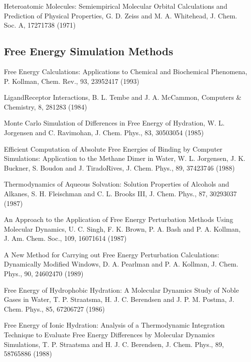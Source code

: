 \documentclass[letterpaper,11pt,english]{sphinxmanual}
\begin{document}
\sphinxAtStartPar
Hetero\sphinxhyphen{}atomic Molecules: Semi\sphinxhyphen{}empirical Molecular Orbital Calculations and Prediction of Physical Properties, G. D. Zeiss and M. A. Whitehead, J. Chem. Soc. A, 1727\sphinxhyphen{}1738 (1971)


\subsection{Free Energy Simulation Methods}
\label{\detokenize{text/references:free-energy-simulation-methods}}
\sphinxAtStartPar
Free Energy Calculations: Applications to Chemical and Biochemical Phenomena, P. Kollman, Chem. Rev., 93, 2395\sphinxhyphen{}2417 (1993)

\sphinxAtStartPar
Ligand\sphinxhyphen{}Receptor Interactions, B. L. Tembe and J. A. McCammon, Computers \& Chemistry, 8, 281\sphinxhyphen{}283 (1984)

\sphinxAtStartPar
Monte Carlo Simulation of Differences in Free Energy of Hydration, W. L. Jorgensen and C. Ravimohan, J. Chem. Phys., 83, 3050\sphinxhyphen{}3054 (1985)

\sphinxAtStartPar
Efficient Computation of Absolute Free Energies of Binding by Computer Simulations:  Application to the Methane Dimer in Water, W. L. Jorgensen, J. K. Buckner, S. Boudon and J. Tirado\sphinxhyphen{}Rives, J. Chem. Phys., 89, 3742\sphinxhyphen{}3746 (1988)

\sphinxAtStartPar
Thermodynamics of Aqueous Solvation:  Solution Properties of Alcohols and Alkanes, S. H. Fleischman and C. L. Brooks III, J. Chem. Phys., 87, 3029\sphinxhyphen{}3037 (1987)

\sphinxAtStartPar
An Approach to the Application of Free Energy Perturbation Methods Using Molecular Dynamics, U. C. Singh, F. K. Brown, P. A. Bash and P. A. Kollman, J. Am. Chem. Soc., 109, 1607\sphinxhyphen{}1614 (1987)

\sphinxAtStartPar
A New Method for Carrying out Free Energy Perturbation Calculations: Dynamically Modified Windows, D. A. Pearlman and P. A. Kollman, J. Chem. Phys., 90, 2460\sphinxhyphen{}2470 (1989)

\sphinxAtStartPar
Free Energy of Hydrophobic Hydration:  A Molecular Dynamics Study of Noble Gases in Water, T. P. Straatsma, H. J. C. Berendsen and J. P. M. Postma, J. Chem. Phys., 85, 6720\sphinxhyphen{}6727 (1986)

\sphinxAtStartPar
Free Energy of Ionic Hydration:  Analysis of a Thermodynamic Integration Technique to Evaluate Free Energy Differences by Molecular Dynamics Simulations, T. P. Straatsma and H. J. C. Berendsen, J. Chem. Phys., 89, 5876\sphinxhyphen{}5886 (1988)
\end{document}
